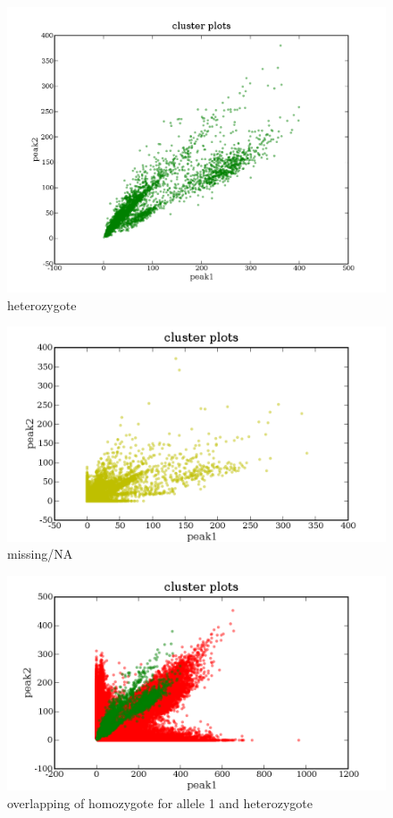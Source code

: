 \documentclass[a4paper,10pt]{article}
\begin{document}
\begin{figure}
\includegraphics[width=1\textwidth]{figures/cluster_plots_het.png}
\caption{heterozygote}\label{f3}
\end{figure}

\begin{figure}
\includegraphics[width=1\textwidth]{figures/cluster_plots_NA.png}
\caption{missing/NA}\label{f4}
\end{figure}

\begin{figure}
\includegraphics[width=1\textwidth]{figures/cluster_plots_allele1_het.png}
\caption{overlapping of homozygote for allele 1 and heterozygote}\label{f5}
\end{figure}
\end{document}
